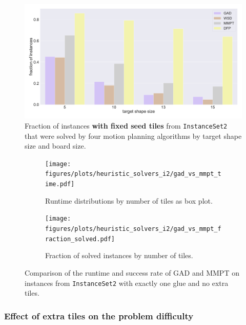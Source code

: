 \begin{figure}[htpb]
\centering
\includegraphics[width=\textwidth]{figures/plots/heuristic_solvers_i2/i2_fraction_solved_over_target_size_fixed_only.pdf}
\caption[Fraction of \texttt{InstanceSet2} with fixed tile solved by several planners]{Fraction of instances \textbf{with fixed seed tiles} from \texttt{InstanceSet2} that were solved by four motion planning algorithms by target shape size and board size.}
\label{fig:i2_fraction_solved_over_target_size_fixed_only}
\end{figure}


\begin{figure}[htpb]
\centering
\begin{subfigure}[b]{0.48\textwidth}
\centering
\texttt{[image: figures/plots/heuristic\_solvers\_i2/gad\_vs\_mmpt\_time.pdf]}
\caption{Runtime distributions by number of tiles as box plot.}
\label{fig:i2_gad_vs_mmpt_time}
\end{subfigure}
\hfill
\begin{subfigure}[b]{0.48\textwidth}
\centering
\texttt{[image: figures/plots/heuristic\_solvers\_i2/gad\_vs\_mmpt\_fraction\_solved.pdf]}
\caption{Fraction of solved instances by number of tiles.}
\label{fig:i2_gad_vs_mmpt_rate}
\end{subfigure}
\caption[Runtime and success rate comparison of GAD and WSD] {Comparison of the runtime and success rate of GAD and MMPT on instances from \texttt{InstanceSet2} with exactly one glue and no extra tiles.}
\label{fig:i2_gad_vs_mmpt}
\end{figure}


\vfill

\subsubsection{Effect of extra tiles on the problem difficulty}

